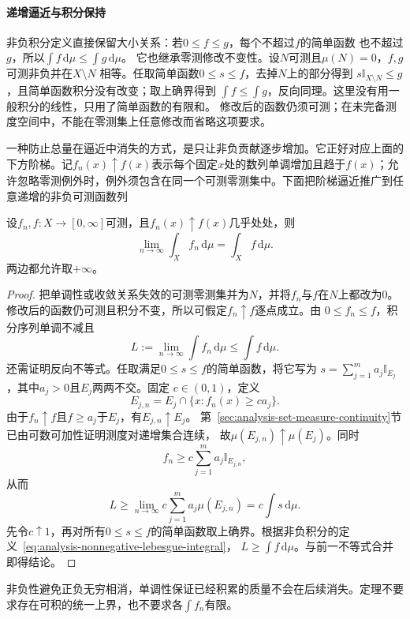 \paragraph{递增逼近与积分保持}

非负积分定义直接保留大小关系：若$0\leq f\leq g$，每个不超过$f$的简单函数
也不超过$g$，所以$\int f\,\mathrm d\mu\leq\int g\,\mathrm d\mu$。
它也继承零测修改不变性。设$N$可测且$\mu(N)=0$，$f,g$可测非负并在$X\setminus N$
相等。任取简单函数$0\leq s\leq f$，去掉$N$上的部分得到
$s\mathbb I_{X\setminus N}\leq g$，且简单函数积分没有改变；取上确界得到
$\int f\leq\int g$，反向同理。这里没有用一般积分的线性，只用了简单函数的有限和。
修改后的函数仍须可测；在未完备测度空间中，不能在零测集上任意修改而省略这项要求。

一种防止总量在逼近中消失的方式，是只让非负贡献逐步增加。它正好对应上面的下方阶梯。记$f_n(x)\uparrow f(x)$表示每个固定$x$处的数列单调增加且趋于$f(x)$；允许忽略零测例外时，例外须包含在同一个可测零测集中。下面把阶梯逼近推广到任意递增的非负可测函数列
\begin{theorem}[单调收敛定理]
\label{thm:analysis-monotone-convergence}
设$f_n,f:X\to[0,\infty]$可测，且$f_n(x)\uparrow f(x)$几乎处处，则
\[   \lim_{n\to\infty}\int_X f_n\,\mathrm{d}\mu   =   \int_X f\,\mathrm{d}\mu. \]
两边都允许取$+\infty$。
\end{theorem}
\begin{proof}
把单调性或收敛关系失效的可测零测集并为$N$，并将$f_n$与$f$在$N$上都改为$0$。
修改后的函数仍可测且积分不变，所以可假定$f_n\uparrow f$逐点成立。由
$0\leq f_n\leq f$，积分序列单调不减且
\[   L:=\lim_{n\to\infty}\int f_n\,\mathrm{d}\mu   \leq\int f\,\mathrm{d}\mu. \]
还需证明反向不等式。任取满足$0\leq s\leq f$的简单函数，将它写为 $s=\sum_{j=1}^m a_j\mathbb{I}_{E_j}$，其中$a_j>0$且$E_j$两两不交。固定 $c\in(0,1)$，定义
\[   E_{j,n}   =   E_j\cap\{x:f_n(x)\geq ca_j\}. \]
由于$f_n\uparrow f$且$f\geq a_j$于$E_j$，有$E_{j,n}\uparrow E_j$。
第~\ref{sec:analysis-set-measure-continuity}节已由可数可加性证明测度对递增集合连续，
故$\mu(E_{j,n})\uparrow\mu(E_j)$。同时
\[   f_n   \geq   c\sum_{j=1}^m a_j\mathbb{I}_{E_{j,n}}, \]
从而
\[   L   \geq   \lim_{n\to\infty}   c\sum_{j=1}^m a_j\mu(E_{j,n})   =   c\int s\,\mathrm{d}\mu. \]
先令$c\uparrow1$，再对所有$0\leq s\leq f$的简单函数取上确界。根据非负积分的定义~\eqref{eq:analysis-nonnegative-lebesgue-integral}， $L\geq\int f\,\mathrm{d}\mu$。与前一不等式合并即得结论。
\end{proof}

非负性避免正负无穷相消，单调性保证已经积累的质量不会在后续消失。定理不要求存在可积的统一上界，也不要求各$\int f_n$有限。


